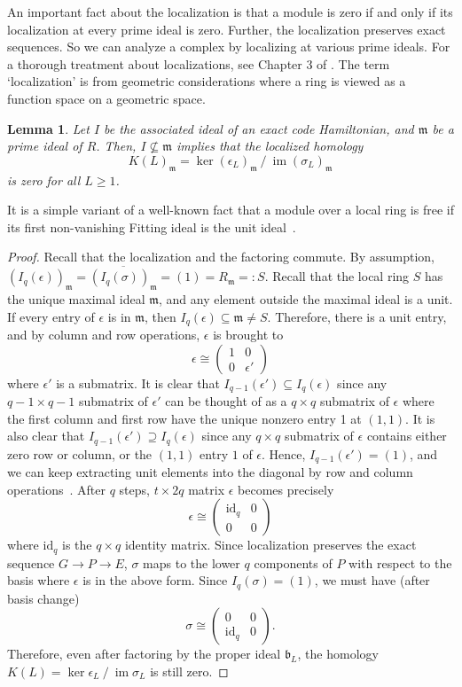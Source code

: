 \documentclass[letterpaper,12pt]{amsart}
\newtheorem{lem}{Lemma}[section]
\theoremstyle{definition} \newtheorem{defn}{Definition}
\theoremstyle{definition} \newtheorem{rem}{Remark}
\theoremstyle{definition} \newtheorem{example}{Example}
\newcommand{\im}{\mathop{\mathrm{im}}}
\newcommand{\mm}{\mathfrak{m}}
\newcommand{\bb}{\mathfrak{b}}
\newcommand{\id}{\mathrm{id}}
\begin{document}
An important fact about the localization is that a module is zero
if and only if its localization at every prime ideal is zero.
Further, the localization preserves exact sequences.
So we can analyze a complex by localizing at various prime ideals.
For a thorough treatment about localizations,
see Chapter 3 of \cite{AtiyahMacDonald}.
The term `localization' is from geometric considerations
where a ring is viewed as a function space on a geometric space.


\begin{lem}
Let $I$ be the associated ideal of an exact code Hamiltonian,
and $\mm$ be a prime ideal of $R$.
Then, $I \not\subseteq \mm$ implies that the localized homology
\[
K(L)_\mm = \ker (\epsilon_L)_\mm ~/~ \im (\sigma_L)_\mm
\]
is zero for all $L \ge 1$.
\label{lem:associated-maximal-localized-homology}
\end{lem}
It is a simple variant of a well-known fact that
a module over a local ring is free if its first non-vanishing Fitting ideal is the unit ideal~\cite[Chapter~1 Theorem~12]{Northcott}.
\begin{proof}
Recall that the localization and the factoring commute.
By assumption, $(I_q(\epsilon))_\mm = \overline{ (I_q(\sigma))_\mm } = (1) = R_\mm =: S$.
Recall that the local ring $S$ has the unique maximal ideal $\mm$,
and any element outside the maximal ideal is a unit.
If every entry of $\epsilon$ is in $\mm$, then $I_q(\epsilon) \subseteq \mm \ne S$.
Therefore, there is a unit entry, and by column and row operations,
$\epsilon$ is brought to
\[
 \epsilon \cong 
\begin{pmatrix}
 1 & 0 \\
 0 & \epsilon'
\end{pmatrix}
\]
where $\epsilon'$ is a submatrix.
It is clear that $I_{q-1}(\epsilon') \subseteq I_q(\epsilon)$
since any $q-1 \times q-1$ submatrix of $\epsilon'$ can be thought of
as a $q \times q$ submatrix of $\epsilon$ where the first column and first row
have the unique nonzero entry 1 at $(1,1)$.
It is also clear that $I_{q-1}(\epsilon') \supseteq I_q(\epsilon)$
since any $q \times q$ submatrix of $\epsilon$ contains
either zero row or column, or the $(1,1)$ entry $1$ of $\epsilon$.
Hence, $I_{q-1}(\epsilon') = (1)$, and
we can keep extracting unit elements
into the diagonal by row and column operations~\cite[Chapter~1 Theorem~12]{Northcott}.
After $q$ steps,
$t \times 2q$ matrix $\epsilon$ becomes precisely
\[
\epsilon \cong 
\begin{pmatrix}
 \id_q & 0 \\
 0 & 0
\end{pmatrix}
\]
where $\id_q$ is the $q \times q$ identity matrix.
Since localization preserves the exact sequence $G \to P \to E$,
$\sigma$ maps to the lower $q$ components of $P$ with respect to the basis
where $\epsilon$ is in the above form.
Since $I_q(\sigma) = (1)$, we must have (after basis change)
\[
\sigma \cong 
\begin{pmatrix}
 0 & 0 \\
 \id_q & 0
\end{pmatrix}.
\]
Therefore, even after factoring by the proper ideal $\bb_L$, 
the homology $K(L) = \ker \epsilon_L ~/~ \im \sigma_L$ is still zero.
\end{proof}
\end{document}
